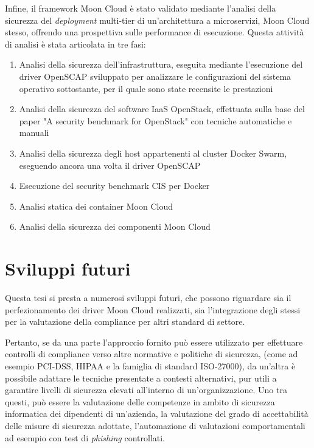 \documentclass[../main.tex]{subfiles}
\begin{document}
Infine, il framework Moon Cloud è stato validato mediante l'analisi della sicurezza del \textit{deployment} multi-tier di un'architettura a microservizi, Moon Cloud stesso, offrendo una prospettiva sulle performance di esecuzione.
Questa attività di analisi è stata articolata in tre fasi:
\begin{enumerate}
    \item Analisi della sicurezza dell'infrastruttura, eseguita mediante l'esecuzione del driver OpenSCAP sviluppato per analizzare le configurazioni del sistema operativo sottostante, per il quale sono state recensite le prestazioni
    \item Analisi della sicurezza del software IaaS OpenStack, effettuata sulla base del paper "A security benchmark for OpenStack" con tecniche automatiche e manuali
    \item Analisi della sicurezza degli host appartenenti al cluster Docker Swarm, eseguendo ancora una volta il driver OpenSCAP
    \item Esecuzione del security benchmark CIS per Docker
    \item Analisi statica dei container Moon Cloud
    \item Analisi della sicurezza dei componenti Moon Cloud
\end{enumerate}




\section {Sviluppi futuri}
Questa tesi si presta a numerosi sviluppi futuri, che possono riguardare sia il perfezionamento dei driver Moon Cloud realizzati, sia l'integrazione degli stessi per la valutazione della compliance per altri standard di settore.

Pertanto, se da una parte l'approccio fornito può essere utilizzato per effettuare controlli di compliance verso altre normative e politiche di sicurezza, (come ad esempio PCI-DSS, HIPAA e la famiglia di standard ISO-27000), da un'altra è possibile adattare le tecniche presentate a contesti alternativi, pur utili a garantire livelli di sicurezza elevati all'interno di un'organizzazione.
Uno tra questi, può essere la valutazione delle competenze in ambito di sicurezza informatica dei dipendenti di un'azienda, la valutazione del grado di accettabilità delle misure di sicurezza adottate, l'automazione di valutazioni comportamentali ad esempio con test di \textit{phishing} controllati.
\end{document}
